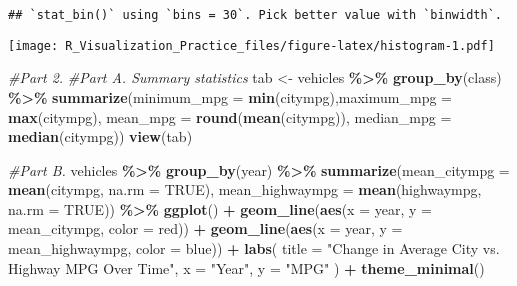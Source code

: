\documentclass[
]{article}
\newenvironment{Shaded}{\begin{snugshade}}{\end{snugshade}}
\newcommand{\AttributeTok}[1]{\textcolor[rgb]{0.13,0.29,0.53}{#1}}
\newcommand{\CommentTok}[1]{\textcolor[rgb]{0.56,0.35,0.01}{\textit{#1}}}
\newcommand{\ConstantTok}[1]{\textcolor[rgb]{0.56,0.35,0.01}{#1}}
\newcommand{\FunctionTok}[1]{\textcolor[rgb]{0.13,0.29,0.53}{\textbf{#1}}}
\newcommand{\NormalTok}[1]{#1}
\newcommand{\OtherTok}[1]{\textcolor[rgb]{0.56,0.35,0.01}{#1}}
\newcommand{\SpecialCharTok}[1]{\textcolor[rgb]{0.81,0.36,0.00}{\textbf{#1}}}
\newcommand{\StringTok}[1]{\textcolor[rgb]{0.31,0.60,0.02}{#1}}
\begin{document}
\begin{verbatim}
## `stat_bin()` using `bins = 30`. Pick better value with `binwidth`.
\end{verbatim}

\texttt{[image: R\_Visualization\_Practice\_files/figure-latex/histogram-1.pdf]}

\begin{Shaded}
\begin{Highlighting}[]
\CommentTok{\#Part 2.}
\CommentTok{\#Part A. Summary statistics}
\NormalTok{tab }\OtherTok{\textless{}{-}}\NormalTok{ vehicles }\SpecialCharTok{\%\textgreater{}\%}
  \FunctionTok{group\_by}\NormalTok{(class) }\SpecialCharTok{\%\textgreater{}\%}
  \FunctionTok{summarize}\NormalTok{(}\AttributeTok{minimum\_mpg =} \FunctionTok{min}\NormalTok{(citympg),}\AttributeTok{maximum\_mpg =} \FunctionTok{max}\NormalTok{(citympg), }\AttributeTok{mean\_mpg =} \FunctionTok{round}\NormalTok{(}\FunctionTok{mean}\NormalTok{(citympg)), }\AttributeTok{median\_mpg =} \FunctionTok{median}\NormalTok{(citympg))}
\FunctionTok{view}\NormalTok{(tab)}
\end{Highlighting}
\end{Shaded}

\begin{Shaded}
\begin{Highlighting}[]
\CommentTok{\#Part B. }
\NormalTok{vehicles }\SpecialCharTok{\%\textgreater{}\%}
  \FunctionTok{group\_by}\NormalTok{(year) }\SpecialCharTok{\%\textgreater{}\%}
  \FunctionTok{summarize}\NormalTok{(}\AttributeTok{mean\_citympg =} \FunctionTok{mean}\NormalTok{(citympg, }\AttributeTok{na.rm =} \ConstantTok{TRUE}\NormalTok{), }
            \AttributeTok{mean\_highwaympg =} \FunctionTok{mean}\NormalTok{(highwaympg, }\AttributeTok{na.rm =} \ConstantTok{TRUE}\NormalTok{)) }\SpecialCharTok{\%\textgreater{}\%}
  \FunctionTok{ggplot}\NormalTok{() }\SpecialCharTok{+}
  \FunctionTok{geom\_line}\NormalTok{(}\FunctionTok{aes}\NormalTok{(}\AttributeTok{x =}\NormalTok{ year, }\AttributeTok{y =}\NormalTok{ mean\_citympg, }\AttributeTok{color =} \StringTok{\textquotesingle{}red\textquotesingle{}}\NormalTok{)) }\SpecialCharTok{+}
  \FunctionTok{geom\_line}\NormalTok{(}\FunctionTok{aes}\NormalTok{(}\AttributeTok{x =}\NormalTok{ year, }\AttributeTok{y =}\NormalTok{ mean\_highwaympg, }\AttributeTok{color =} \StringTok{\textquotesingle{}blue\textquotesingle{}}\NormalTok{)) }\SpecialCharTok{+}
  \FunctionTok{labs}\NormalTok{(}
    \AttributeTok{title =} \StringTok{"Change in Average City vs. Highway MPG Over Time"}\NormalTok{,}
    \AttributeTok{x =} \StringTok{"Year"}\NormalTok{,}
    \AttributeTok{y =} \StringTok{"MPG"}
\NormalTok{  ) }\SpecialCharTok{+}
  \FunctionTok{theme\_minimal}\NormalTok{()}
\end{Highlighting}
\end{Shaded}
\end{document}
